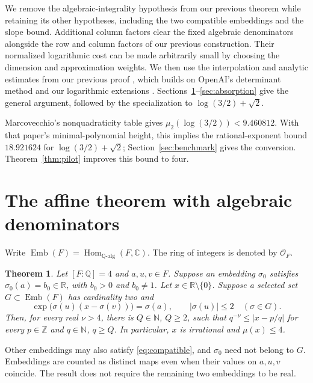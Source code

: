 \documentclass[11pt]{article}
\newcommand{\R}{\mathbb R}
\newcommand{\Q}{\mathbb Q}
\newcommand{\Z}{\mathbb Z}
\newcommand{\C}{\mathbb C}
\newcommand{\N}{\mathbb N}
\newcommand{\OO}{\mathcal O}
\newtheorem{theorem}{Theorem}[section]
\theoremstyle{remark}
\begin{document}
We remove the algebraic-integrality hypothesis from our previous theorem
while retaining its other hypotheses, including the two compatible
embeddings and the slope bound. Additional column factors clear the
fixed algebraic denominators alongside the row and column factors of
our previous construction. Their normalized logarithmic cost can be
made arbitrarily small by choosing the dimension and approximation
weights. We then use the interpolation and analytic estimates from our
previous proof \cite{affine}, which builds on OpenAI's determinant
method \cite{openai} and our logarithmic extensions
\cite{rational,quadratic}. Sections~\ref{sec:common}--\ref{sec:absorption}
give the general argument, followed by the specialization to
$\log(3/2)+\sqrt2$.

Marcovecchio's nonquadraticity table \cite{marcovecchio} gives
$\mu_2(\log(3/2))<9.460812$. With that paper's
minimal-polynomial height, this implies the rational-exponent bound
$18.921624$ for $\log(3/2)+\sqrt2$; Section~\ref{sec:benchmark}
gives the conversion. Theorem~\ref{thm:pilot} improves this bound to four.

\section{The affine theorem with algebraic denominators}\label{sec:common}
Write $\operatorname{Emb}(F)=\operatorname{Hom}_{\Q\text{-alg}}(F,\C)$.
The ring of integers is denoted by $\OO_F$.

\begin{theorem}\label{thm:general}
Let $[F:\Q]=4$ and $a,u,v\in F$. Suppose an embedding $\sigma_0$
satisfies $\sigma_0(a)=b_0\in\R$, with $b_0>0$ and $b_0\ne1$.
Let $x\in\R\setminus\{0\}$. Suppose a selected set
$G\subset\operatorname{Emb}(F)$ has cardinality two and
\begin{equation}\label{eq:compatible}
 \exp\bigl(\sigma(u)(x-\sigma(v))\bigr)=\sigma(a),
 \qquad |\sigma(u)|\le2 \quad(\sigma\in G).
\end{equation}
Then, for every real $\nu>4$, there is $Q\in\N$, $Q\ge2$, such that
$q^{-\nu}\le |x-p/q|$ for every $p\in\Z$ and $q\in\N$, $q\ge Q$.
In particular, $x$ is irrational and $\mu(x)\le4$.
\end{theorem}

Other embeddings may also satisfy \eqref{eq:compatible}, and
$\sigma_0$ need not belong to $G$. Embeddings are counted as distinct
maps even when their values on $a,u,v$ coincide. The result does not
require the remaining two embeddings to be real.
\end{document}
